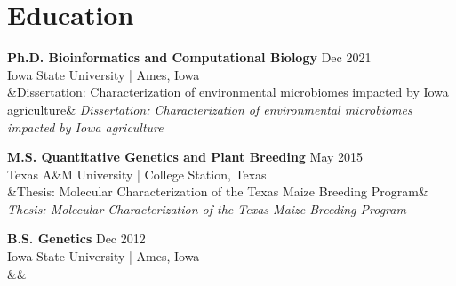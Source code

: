 \newcommand{\Edu}[4]{
  \textbf{#1} \hfill #3 \\   %
  #2 \\                       %
  \ifx&#4&\else                %
    \textit{#4} \\
  \fi
  \vspace{0.5em}             %
}


\section*{Education}

\Edu
  {Ph.D. Bioinformatics and Computational Biology}
  {Iowa State University | Ames, Iowa}
  {Dec 2021}
  {Dissertation: Characterization of environmental microbiomes impacted by Iowa agriculture}

\Edu
  {M.S. Quantitative Genetics and Plant Breeding}
  {Texas A\&M University | College Station, Texas}
  {May 2015}
  {Thesis: Molecular Characterization of the Texas Maize Breeding Program}

\Edu
  {B.S. Genetics}
  {Iowa State University | Ames, Iowa}
  {Dec 2012}
  {}
